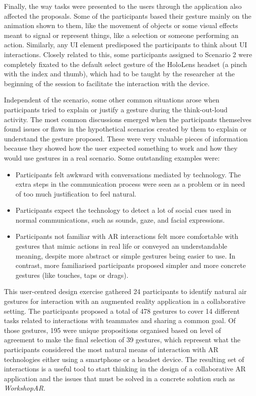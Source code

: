 Finally, the way tasks were presented to the users through the application also affected the proposals. Some of the participants based their gesture mainly on the
animation shown to them, like the movement of objects or some visual effects meant to signal or represent things, like a selection or someone performing an action.
Similarly, any UI element predisposed the participants to think about UI interactions. Closely related to this, some participants assigned to Scenario 2 were completely
fixated to the default select gesture of the HoloLens headset (a pinch with the index and thumb), which had to be taught by the researcher at the beginning of the session
to facilitate the interaction with the device.

Independent of the scenario, some other common situations arose  when participants tried to explain or justify a gesture during the think-out-loud activity. The most
common discussions emerged when the participants themselves found issues or flaws in the hypothetical scenarios created by them to explain or understand the gesture
proposed. These were very valuable pieces of information because they showed how the user expected something to work and how they would use gestures in a real scenario.
Some outstanding examples were:

\begin{itemize}
    \item Participants felt awkward with conversations mediated by technology. The extra steps in the communication process were seen as a problem or in need of too much
    justification to feel natural.
    \item Participants expect the technology to detect a lot of social cues used in normal communications, such as sounds, gaze, and facial expressions.
    \item Participants not familiar with \ac{AR} interactions felt more comfortable with gestures that mimic actions in real life or conveyed an understandable meaning, despite
    more abstract or simple gestures being easier to use. In contrast, more familiarised participants proposed simpler and more concrete gestures (like touches, taps or
    drags).
\end{itemize}

This user-centred design exercise gathered 24 participants to identify natural air gestures for interaction with an augmented reality application in a collaborative
setting. The participants proposed a total of 478 gestures to cover 14 different tasks related to interactions with teammates and sharing a common goal. Of those gestures,
195 were unique propositions organised based on level of agreement to make the final selection of 39 gestures, which represent what the participants considered the most
natural means of interaction with \ac{AR} technologies either using a smartphone or a headset device. The resulting set of interactions is a useful tool to start thinking
in the design of a collaborative \ac{AR} application and the issues that must be solved in a concrete solution such as \emph{WorkshopAR}.

